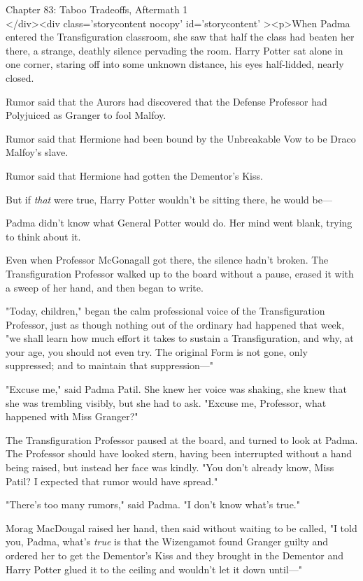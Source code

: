 
Chapter 83: Taboo Tradeoffs, Aftermath 1\\
</div><div  class='storycontent nocopy' id='storycontent' ><p>When Padma entered the Transfiguration classroom, she saw that half the class had beaten her there, a strange, deathly silence pervading the room. Harry Potter sat alone in one corner, staring off into some unknown distance, his eyes half-lidded, nearly closed.

Rumor said that the Aurors had discovered that the Defense Professor had Polyjuiced as Granger to fool Malfoy.

Rumor said that Hermione had been bound by the Unbreakable Vow to be Draco Malfoy's slave.

Rumor said that Hermione had gotten the Dementor's Kiss.

But if \emph{that} were true, Harry Potter wouldn't be sitting there, he would be---

Padma didn't know what General Potter would do. Her mind went blank, trying to think about it.

Even when Professor McGonagall got there, the silence hadn't broken. The Transfiguration Professor walked up to the board without a pause, erased it with a sweep of her hand, and then began to write.

"Today, children," began the calm professional voice of the Transfiguration Professor, just as though nothing out of the ordinary had happened that week, "we shall learn how much effort it takes to sustain a Transfiguration, and why, at your age, you should not even try. The original Form is not gone, only suppressed; and to maintain that suppression---"

"Excuse me," said Padma Patil. She knew her voice was shaking, she knew that she was trembling visibly, but she had to ask. "Excuse me, Professor, what happened with Miss Granger?"

The Transfiguration Professor paused at the board, and turned to look at Padma. The Professor should have looked stern, having been interrupted without a hand being raised, but instead her face was kindly. "You don't already know, Miss Patil? I expected that rumor would have spread."

"There's too many rumors," said Padma. "I don't know what's true."

Morag MacDougal raised her hand, then said without waiting to be called, "I told you, Padma, what's \emph{true} is that the Wizengamot found Granger guilty and ordered her to get the Dementor's Kiss and they brought in the Dementor and Harry Potter glued it to the ceiling and wouldn't let it down until---"

